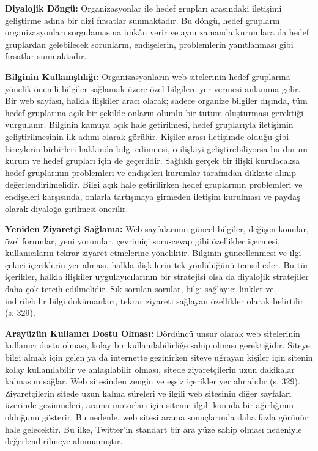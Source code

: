 \documentclass[
]{book}
\begin{document}
\textbf{Diyalojik Döngü:} Organizasyonlar ile hedef grupları arasındaki iletişimi geliştirme adına bir dizi fırsatlar sunmaktadır. Bu döngü, hedef grupların organizasyonları sorgulamasına imkân verir ve aynı zamanda kurumlara da hedef gruplardan gelebilecek sorunların, endişelerin, problemlerin yanıtlanması gibi fırsatlar sunmaktadır.

\textbf{Bilginin Kullanışlılığı:} Organizasyonların web sitelerinin hedef gruplarına yönelik önemli bilgiler sağlamak üzere özel bilgilere yer vermesi anlamına gelir. Bir web sayfası, halkla ilişkiler aracı olarak; sadece organize bilgiler dışında, tüm hedef gruplarına açık bir şekilde onların olumlu bir tutum oluşturması gerektiği vurgulanır. Bilginin kamuya açık hale getirilmesi, hedef gruplarıyla iletişimin geliştirilmesinin ilk adımı olarak görülür. Kişiler arası iletişimde olduğu gibi bireylerin birbirleri hakkında bilgi edinmesi, o ilişkiyi geliştirebiliyorsa bu durum kurum ve hedef grupları için de geçerlidir. Sağlıklı gerçek bir ilişki kurulacaksa hedef gruplarının problemleri ve endişeleri kurumlar tarafından dikkate alınıp değerlendirilmelidir. Bilgi açık hale getirilirken hedef gruplarının problemleri ve endişeleri karşısında, onlarla tartışmaya girmeden iletişim kurulması ve paydaş olarak diyaloğa girilmesi önerilir.

\textbf{Yeniden Ziyaretçi Sağlama:} Web sayfalarının güncel bilgiler, değişen konular, özel forumlar, yeni yorumlar, çevrimiçi soru-cevap gibi özellikler içermesi, kullanıcıların tekrar ziyaret etmelerine yöneliktir. Bilginin güncellenmesi ve ilgi çekici içeriklerin yer alması, halkla ilişkilerin tek yönlülüğünü temsil eder. Bu tür içerikler, halkla ilişkiler uygulayıcılarının bir stratejisi olsa da diyalojik stratejiler daha çok tercih edilmelidir. Sık sorulan sorular, bilgi sağlayıcı linkler ve indirilebilir bilgi dokümanları, tekrar ziyareti sağlayan özellikler olarak belirtilir (s. 329). \citep{kent1998building}

\textbf{Arayüzün Kullanıcı Dostu Olması:} Dördüncü unsur olarak web sitelerinin kullanıcı dostu olması, kolay bir kullanılabilirliğe sahip olması gerektiğidir. Siteye bilgi almak için gelen ya da internette gezinirken siteye uğrayan kişiler için sitenin kolay kullanılabilir ve anlaşılabilir olması, sitede ziyaretçilerin uzun dakikalar kalmasını sağlar. Web sitesinden zengin ve eşsiz içerikler yer almalıdır (s. 329). \citep{kent1998building} Ziyaretçilerin sitede uzun kalma süreleri ve ilgili web sitesinin diğer sayfaları üzerinde gezinmeleri, arama motorları için sitenin ilgili konuda bir ağırlığının olduğunu gösterir. Bu nedenle, web sitesi arama sonuçlarında daha fazla görünür hale gelecektir. Bu ilke, Twitter'in standart bir ara yüze sahip olması nedeniyle değerlendirilmeye alınmamıştır.
\end{document}
